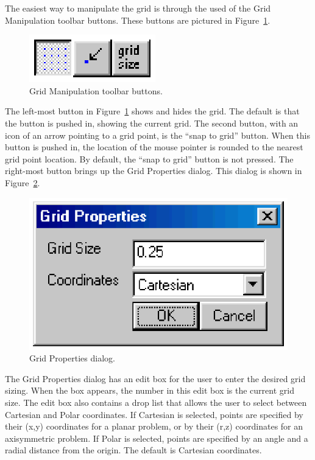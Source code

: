 \documentclass[12pt]{report}
\begin{document}
The easiest way to manipulate the grid is through the used of the
Grid Manipulation toolbar buttons.  These buttons are pictured in
Figure~\ref{gridbuttons}.
\begin{figure}[ht]
\centerline{\includegraphics{gridbtn.ps}}
\caption{Grid Manipulation toolbar buttons.}
\label{gridbuttons}
\end{figure}
The left-most button in Figure~\ref{gridbuttons} shows and hides
the grid.  The default is that the button is pushed in, showing the
current grid.  The second button, with an icon of an arrow pointing
to a grid point, is the ``snap to grid'' button.  When this button
is pushed in, the location of the mouse pointer is rounded to the
nearest grid point location.  By default, the ``snap to grid''
button is not pressed.  The right-most button brings up the Grid
Properties dialog. This dialog is shown in Figure~\ref{griddialog}.
\begin{figure}[ht]
\centerline{\includegraphics{griddlg.ps}}
\caption{Grid Properties dialog.}
\label{griddialog}
\end{figure}

The Grid Properties dialog has an edit box for the user to enter
the desired grid sizing.  When the box appears, the number in this
edit box is the current grid size.  The edit box also contains a
drop list that allows the user to select between Cartesian and
Polar coordinates.  If Cartesian is selected, points are specified
by their (x,y) coordinates for a planar problem, or by their (r,z)
coordinates for an axisymmetric problem.  If Polar is selected,
points are specified by an angle and a radial distance from the
origin.  The default is Cartesian coordinates.
\end{document}
